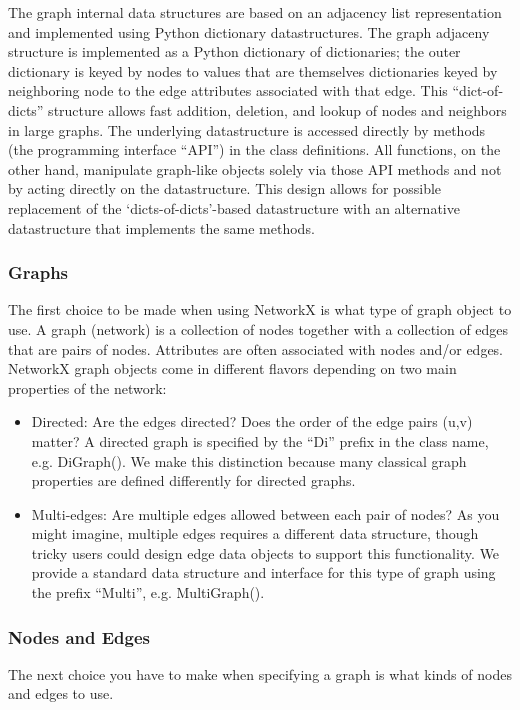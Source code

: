 The graph internal data structures are based on an adjacency list representation and implemented using Python dictionary datastructures. The graph adjaceny structure is implemented as a Python dictionary of dictionaries; the outer dictionary is keyed by nodes to values that are themselves dictionaries keyed by neighboring node to the edge attributes associated with that edge. This “dict-of-dicts” structure allows fast addition, deletion, and lookup of nodes and neighbors in large graphs. The underlying datastructure is accessed directly by methods (the programming interface “API”) in the class definitions. All functions, on the other hand, manipulate graph-like objects solely via those API methods and not by acting directly on the datastructure. This design allows for possible replacement of the ‘dicts-of-dicts’-based datastructure with an alternative datastructure that implements the same methods.
\subsubsection{Graphs}
The first choice to be made when using NetworkX is what type of graph object to use. A graph (network) is a collection of nodes together with a collection of edges that are pairs of nodes. Attributes are often associated with nodes and/or edges. NetworkX graph objects come in different flavors depending on two main properties of the network:

\begin{itemize}
	\item Directed: Are the edges directed? Does the order of the edge pairs (u,v) matter? A directed graph is specified by the “Di” prefix in the class name, e.g. DiGraph(). We make this distinction because many classical graph properties are defined differently for directed graphs.
	\item Multi-edges: Are multiple edges allowed between each pair of nodes? As you might imagine, multiple edges requires a different data structure, though tricky users could design edge data objects to support this functionality. We provide a standard data structure and interface for this type of graph using the prefix “Multi”, e.g. MultiGraph().
	
\end{itemize}
\subsubsection{Nodes and Edges}
The next choice you have to make when specifying a graph is what kinds of nodes and edges to use.\\

